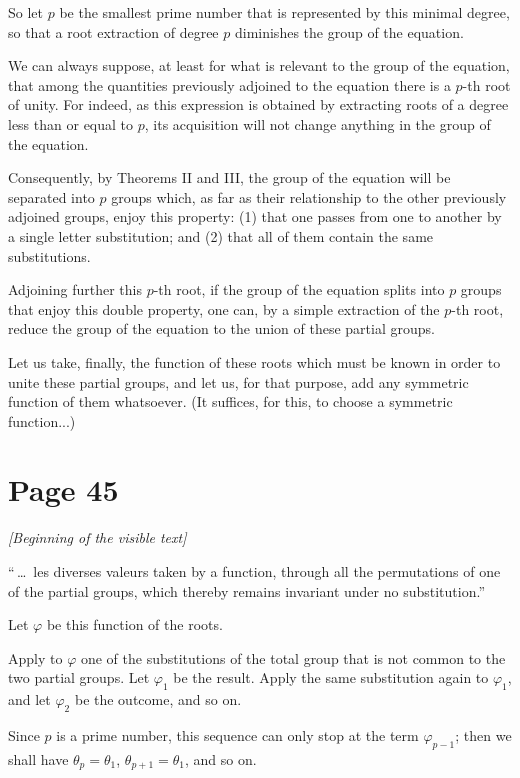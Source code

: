 \documentclass{article}
\begin{document}
So let $p$ be the smallest prime number that is represented by this minimal degree, so that a root extraction of degree $p$ diminishes the group of the equation.

We can always suppose, at least for what is relevant to the group of the equation, that among the quantities previously adjoined to the equation there is a $p$-th root of unity. For indeed, as this expression is obtained by extracting roots of a degree less than or equal to $p$, its acquisition will not change anything in the group of the equation.

Consequently, by Theorems II and III, the group of the equation will be separated into $p$ groups which, as far as their relationship to the other previously adjoined groups, enjoy this property: (1) that one passes from one to another by a single letter substitution; and (2) that all of them contain the same substitutions.

Adjoining further this $p$-th root, if the group of the equation splits into $p$ groups that enjoy this double property, one can, by a simple extraction of the $p$-th root, reduce the group of the equation to the union of these partial groups.

Let us take, finally, the function of these roots which must be known in order to unite these partial groups, and let us, for that purpose, add any symmetric function of them whatsoever. (It suffices, for this, to choose a symmetric function...) 


\section*{Page 45}

\noindent
\textit{[Beginning of the visible text]}

\noindent
“\,\dots\ les diverses valeurs taken by a function, through all the permutations of one of the partial groups, which thereby remains invariant under no substitution.”

\medskip
\noindent
Let $\varphi$ be this function of the roots.

\noindent
Apply to $\varphi$ one of the substitutions of the total group that is not common to the two partial groups. Let $\varphi_{1}$ be the result. Apply the same substitution again to $\varphi_{1}$, and let $\varphi_{2}$ be the outcome, and so on.

\noindent
Since $p$ is a prime number, this sequence can only stop at the term $\varphi_{p-1}$; then we shall have $\theta_{p} = \theta_{1}$, $\theta_{p+1} = \theta_{1}$, and so on.
\end{document}
